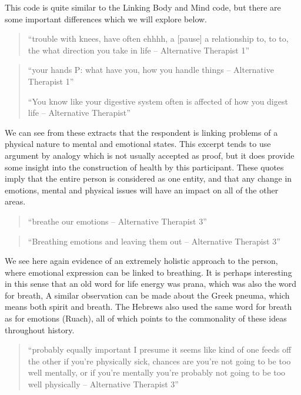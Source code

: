 This code is quite similar to the Linking Body and Mind code, but there are some important differences which we will explore below. 

\begin{quotation}
``trouble with knees, have often ehhhh, a [pause] a relationship to, to to, the what direction you take in life – Alternative Therapist 1''
  
\end{quotation}

\begin{quotation}
``your hands 
P: what have you, how you handle things – Alternative Therapist 1''

``You know like your digestive system often is affected of how you digest life – Alternative Therapist''  
\end{quotation}



We can see from these extracts that the respondent is linking problems of a physical nature to mental and emotional states. This excerpt tends to use argument by analogy which is not usually accepted as proof, but it does provide some insight into the construction of health by this participant. These quotes imply that the entire person is considered as one entity, and that any change in emotions, mental and physical issues will have an impact on all of the other areas. 

\begin{quotation}
``breathe our emotions – Alternative Therapist 3''  
\end{quotation}


\begin{quotation}
  ``Breathing emotions and leaving them out – Alternative Therapist 3''
\end{quotation}

We see here again evidence of an extremely holistic approach to the person, where emotional expression can be linked to breathing. It is perhaps interesting in this sense that an old word for life energy was prana, which was also the word for breath, A similar observation can be made about the Greek pneuma, which means both spirit and breath. The Hebrews also used the same word for breath as for emotions (Ruach), all of which points to the commonality of these ideas throughout history. 

\begin{quotation}
``probably equally important I presume it seems like kind of one feeds off the other if you're physically sick, chances are you're not going to be too well mentally, or if you're mentally you're probably not going to be too well physically – Alternative Therapist 3''  
\end{quotation}


